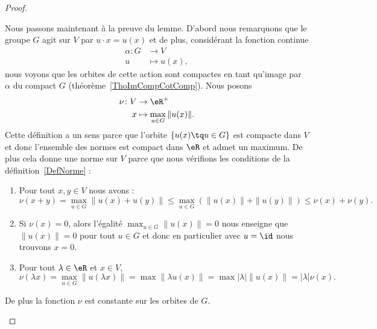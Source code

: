 \begin{proof}
\begin{subproof}
		Nous passons maintenant à la preuve du lemme. D'abord nous remarquons que le groupe \( G\) agit sur \( V\) par \( u\cdot x=u(x)\) et de plus, considérant la fonction continue
		\begin{equation}
			\begin{aligned}
				\alpha\colon G & \to V         \\
				u              & \mapsto u(x),
			\end{aligned}
		\end{equation}
		nous voyons que les orbites de cette action sont compactes en tant qu'image par \( \alpha\) du compact \( G\) (théorème~\ref{ThoImCompCotComp}). Nous posons
		\begin{equation}
			\begin{aligned}
				\nu\colon V & \to \eR^+                        \\
				x           & \mapsto \max_{u\in G}\| u(x) \|.
			\end{aligned}
		\end{equation}
		Cette définition a un sens parce que l'orbite \( \{ u(x)\tq u\in G \}\) est compacte dans \( V\) et donc l'ensemble des normes est compact dans \( \eR\) et admet un maximum. De plus cela donne une norme sur \( V\) parce que nous vérifions les conditions de la définition~\ref{DefNorme} :
		\begin{enumerate}
			\item
			      Pour tout \( x,y\in V\) nous avons :
			      \begin{equation}
				      \nu(x+y)=\max_{u\in G}\| u(x)+u(y) \|\leq \max_{u\in G}\left( \| u(x) \|+\| u(y) \| \right)\leq \nu(x)+\nu(y).
			      \end{equation}
			\item
			      Si \( \nu(x)=0\), alors l'égalité \( \max_{u\in G}\| u(x) \|=0\) nous enseigne que \( \| u(x) \|=0\) pour tout \( u\in G\) et donc en particulier avec \( u=\id\) nous trouvons \( x=0\).
			\item
			      Pour tout \( \lambda\in \eR\) et \( x\in V\),
			      \begin{equation}
				      \nu(\lambda x)=\max_{u\in G}\| u(\lambda x) \|=\max\| \lambda u(x) \|=\max| \lambda |\| u(x) \|=| \lambda |\nu(x).
			      \end{equation}
		\end{enumerate}
		De plus la fonction \( \nu\) est constante sur les orbites de \( G\).



\end{subproof}
\end{proof}
